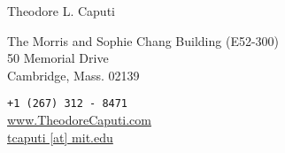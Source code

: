 \documentclass[11pt, letterpaper]{article}
\newcommand*{\img}[1]{%
    \raisebox{-.3\baselineskip}{%
        \texttt{[image: \#1]}%
    }%
}
\begin{document}
\large
{\huge Theodore L. Caputi}\\[.55cm]
%
%

\noindent{\tabcolsep}\begin{minipage}{0.6\linewidth}
The Morris and Sophie Chang Building (E52-300)\\
50 Memorial Drive\\
Cambridge, Mass. 02139 %
\end{minipage}
\begin{minipage}{0.4\linewidth}
\texttt{+1 (267) 312 - 8471}\\
\href{http://www.TheodoreCaputi.com}{www.TheodoreCaputi.com}\\
\href{mailto:tcaputi@mit.edu}{tcaputi [at] mit.edu}

\end{minipage}\\[.2cm]
%
\end{document}
